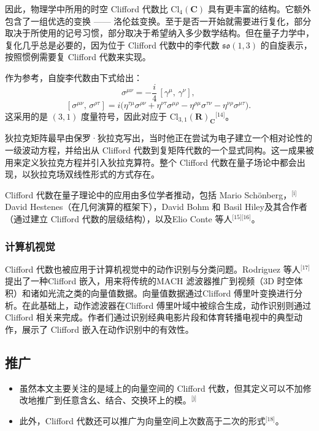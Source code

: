 因此，物理学中所用的时空 Clifford 代数比 $\mathrm{Cl}_4(\mathbf{C})$ 具有更丰富的结构。它额外包含了一组优选的变换 —— 洛伦兹变换。至于是否一开始就需要进行复化，部分取决于所使用的记号习惯，部分取决于希望纳入多少数学结构。但在量子力学中，复化几乎总是必要的，因为位于 Clifford 代数中的李代数 $\mathfrak{so}(1,3)$ 的自旋表示，按照惯例需要复 Clifford 代数来实现。

作为参考，自旋李代数由下式给出：
$$
\sigma^{\mu\nu} = -\frac{i}{4}\,[\gamma^\mu,\, \gamma^\nu], ~
$$
$$
[\sigma^{\mu\nu},\, \sigma^{\rho\tau}] = i \big( \eta^{\tau\mu}\sigma^{\rho\nu} + \eta^{\nu\tau}\sigma^{\mu\rho} - \eta^{\rho\mu}\sigma^{\tau\nu} - \eta^{\nu\rho}\sigma^{\mu\tau} \big).~
$$
这采用的是 $(3,1)$ 度量符号，因此对应于 $\mathrm{Cl}_{3,1}(\mathbf{R})_{\mathbf{C}}$\(^\text{[14]}\)。

狄拉克矩阵最早由保罗·狄拉克写出，当时他正在尝试为电子建立一个相对论性的一级波动方程，并给出从 Clifford 代数到复矩阵代数的一个显式同构。这一成果被用来定义狄拉克方程并引入狄拉克算符。整个 Clifford 代数在量子场论中都会出现，以狄拉克场双线性形式的方式存在。

Clifford 代数在量子理论中的应用由多位学者推动，包括 Mario Schönberg，\(^\text{[i]}\)David Hestenes（在几何演算的框架下），David Bohm 和 Basil Hiley及其合作者（通过建立 Clifford 代数的层级结构），以及Elio Conte 等人\(^\text{[15][16]}\)。
\subsubsection{计算机视觉}
Clifford 代数也被应用于计算机视觉中的动作识别与分类问题。Rodriguez 等人\(^\text{[17]}\)提出了一种Clifford 嵌入，用来将传统的MACH 滤波器推广到视频（3D 时空体积）和诸如光流之类的向量值数据。向量值数据通过Clifford 傅里叶变换进行分析。在此基础上，动作滤波器在Clifford 傅里叶域中被综合生成，动作识别则通过Clifford 相关来完成。作者们通过识别经典电影片段和体育转播电视中的典型动作，展示了 Clifford 嵌入在动作识别中的有效性。
\subsection{推广}
\begin{itemize}
\item 虽然本文主要关注的是域上的向量空间的 Clifford 代数，但其定义可以不加修改地推广到任意含幺、结合、交换环上的模。\(^\text{[j]}\)
\item 此外，Clifford 代数还可以推广为向量空间上次数高于二次的形式\(^\text{[18]}\)。
\end{itemize}
